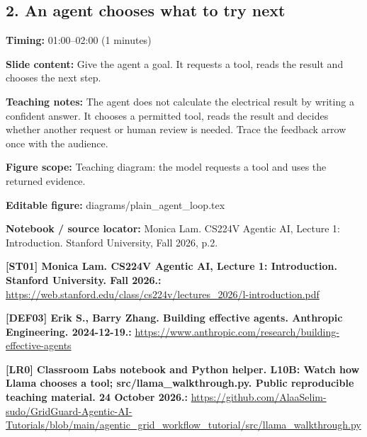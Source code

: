 \documentclass[10pt,letterpaper]{article}
\begin{document}
\subsection*{2. An agent chooses what to try next}
\textbf{Timing:} 01:00--02:00 (1 minutes)\par
\textbf{Slide content:} Give the agent a goal. It requests a tool, reads the result and chooses the next step.\par
\textbf{Teaching notes:} The agent does not calculate the electrical result by writing a confident answer. It chooses a permitted tool, reads the result and decides whether another request or human review is needed. Trace the feedback arrow once with the audience.\par
\textbf{Figure scope:} Teaching diagram: the model requests a tool and uses the returned evidence.\par
\textbf{Editable figure:} diagrams/plain\_agent\_loop.tex\par
\textbf{Notebook / source locator:} Monica Lam. CS224V Agentic AI, Lecture 1: Introduction. Stanford University, Fall 2026, p.2.\par
\textbf{[ST01] Monica Lam. CS224V Agentic AI, Lecture 1: Introduction. Stanford University. Fall 2026.:} \href{https://web.stanford.edu/class/cs224v/lectures_2026/l-introduction.pdf}{\small\ttfamily https:/\allowbreak{}/\allowbreak{}web.\allowbreak{}stanford.\allowbreak{}edu/\allowbreak{}class/\allowbreak{}cs224v/\allowbreak{}lectures\_\allowbreak{}2026/\allowbreak{}l-\allowbreak{}introduction.\allowbreak{}pdf}\par
\textbf{[DEF03] Erik S., Barry Zhang. Building effective agents. Anthropic Engineering. 2024-12-19.:} \href{https://www.anthropic.com/research/building-effective-agents}{\small\ttfamily https:/\allowbreak{}/\allowbreak{}www.\allowbreak{}anthropic.\allowbreak{}com/\allowbreak{}research/\allowbreak{}building-\allowbreak{}effective-\allowbreak{}agents}\par
\textbf{[LR0] Classroom Labs notebook and Python helper. L10B: Watch how Llama chooses a tool; src/llama\_walkthrough.py. Public reproducible teaching material. 24 October 2026.:} \href{https://github.com/AlaaSelim-sudo/GridGuard-Agentic-AI-Tutorials/blob/main/agentic_grid_workflow_tutorial/src/llama_walkthrough.py}{\small\ttfamily https:/\allowbreak{}/\allowbreak{}github.\allowbreak{}com/\allowbreak{}AlaaSelim-\allowbreak{}sudo/\allowbreak{}GridGuard-\allowbreak{}Agentic-\allowbreak{}AI-\allowbreak{}Tutorials/\allowbreak{}blob/\allowbreak{}main/\allowbreak{}agentic\_\allowbreak{}grid\_\allowbreak{}workflow\_\allowbreak{}tutorial/\allowbreak{}src/\allowbreak{}llama\_\allowbreak{}walkthrough.\allowbreak{}py}\par
\par\medskip
\end{document}
